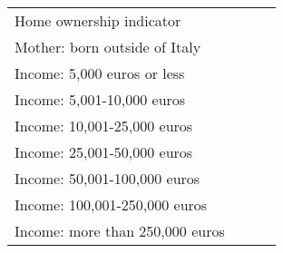 \begin{table}[htbp]
\begin{tabular}{l*{1}{ccc}}
Home ownership indicator&                     &            &            \\
Mother: born outside of Italy&                     &            &            \\
Income: 5,000 euros or less&                     &            &            \\
Income: 5,001-10,000 euros&                     &            &            \\
Income: 10,001-25,000 euros&                     &            &            \\
Income: 25,001-50,000 euros&                     &            &            \\
Income: 50,001-100,000 euros&                     &            &            \\
Income: 100,001-250,000 euros&                     &            &            \\
Income: more than 250,000 euros&                     &            &            \\
\bottomrule
\end{tabular}
\end{table}
